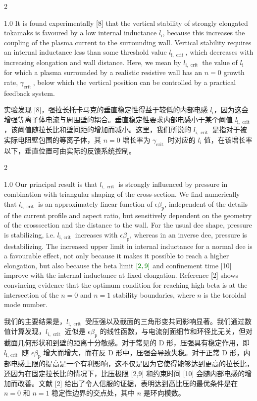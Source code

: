 \documentclass[utf8]{ctexart}
\newcommand\enzhbox[2]{
  	\quad\par \begin{paracol}{2} \colseprulecolor{black} 
  		\begin{spacing}{1.0}
  			\footnotesize  #1
  		\end{spacing}
  		\switchcolumn[1] 
  		#2
  	\end{paracol} \quad\par
  }
\begin{document}
\begin{sloppypar}
 
\enzhbox{  It is found experimentally \textcolor{green!50!black}{[8]} that the vertical stability of strongly elongated tokamaks is favoured by a low internal inductance $l_{\mathrm{i}}$, because this increases the coupling of the plasma current to the surrounding wall. Vertical stability requires an internal inductance less than some threshold value $l_{\mathrm{i}, \text { crit }}$, which decreases with increasing elongation and wall distance. Here, we mean by $l_{\mathrm{i}, \text { crit }}$ the value of $l_{\mathrm{i}}$ for which a plasma surrounded by a realistic resistive wall has an $n=0$ growth rate, $\gamma_{\text {crit }}$, below which the vertical position can be controlled by a practical feedback system.}{
实验发现 \textcolor{green!50!black}{[8]}，强拉长托卡马克的垂直稳定性得益于较低的内部电感 $l_{\mathrm{i}}$，因为这会增强等离子体电流与周围壁的耦合。垂直稳定性要求内部电感小于某个阈值 $l_{\mathrm{i}, \text { crit }}$，该阈值随拉长比和壁间距的增加而减小。这里，我们所说的 $l_{\mathrm{i}, \text { crit }}$ 是指对于被实际电阻壁包围的等离子体，其 $n = 0$ 增长率为 $\gamma_{\text {crit }}$ 时对应的 $l_{\mathrm{i}}$ 值，在该增长率以下，垂直位置可由实际的反馈系统控制。 }
  
  
 
\enzhbox{  Our principal result is that $l_{\mathrm{i}, \text { crit }}$ is strongly influenced by pressure in combination with triangular shaping of the cross-section. We find numerically that $l_{i, \text { crit }}$ is an approximately linear function of $\epsilon \beta_{\mathrm{p}}$, independent of the details of the current profile and aspect ratio, but sensitively dependent on the geometry of the crosssection and the distance to the wall. For the usual dee shape, pressure is stabilizing, i.e. $l_{\mathrm{i} \text {, crit }}$ increases with $\epsilon \beta_{\mathrm{p}}$, whereas in an inverse dee, pressure is destabilizing. The increased upper limit in internal inductance for a normal dee is a favourable effect, not only because it makes it possible to reach a higher elongation, but also because the beta limit $\textcolor{green!50!black}{[2,9]}$ and confinement time \textcolor{green!50!black}{[10]} improve with the internal inductance at fixed elongation. Reference \textcolor{green!50!black}{[2]} shows convincing evidence that the optimum condition for reaching high beta is at the intersection of the $n=0$ and $n=1$ stability boundaries, where $n$ is the toroidal mode number.}{
我们的主要结果是，$l_{\mathrm{i}, \text { crit }}$ 受压强以及截面的三角形变共同影响显著。我们通过数值计算发现，$l_{i, \text { crit }}$ 近似是 $\epsilon \beta_{\mathrm{p}}$ 的线性函数，与电流剖面细节和环径比无关，但对截面几何形状和到壁的距离十分敏感。对于常见的 D 形，压强具有稳定作用，即 $l_{\mathrm{i} \text {, crit }}$ 随 $\epsilon \beta_{\mathrm{p}}$ 增大而增大，而在反 D 形中，压强会导致失稳。对于正常 D 形，内部电感上限的提高是一个有利影响，这不仅是因为它使得能够达到更高的拉长比，还因为在固定拉长比的情况下，比压极限 \textcolor{green!50!black}{[2,9]} 和约束时间 \textcolor{green!50!black}{[10]} 会随内部电感的增加而改善。文献 \textcolor{green!50!black}{[2]} 给出了令人信服的证据，表明达到高比压的最优条件是在 $n = 0$ 和 $n = 1$ 稳定性边界的交点处，其中 $n$ 是环向模数。 }
  

\end{sloppypar}
\end{document}
